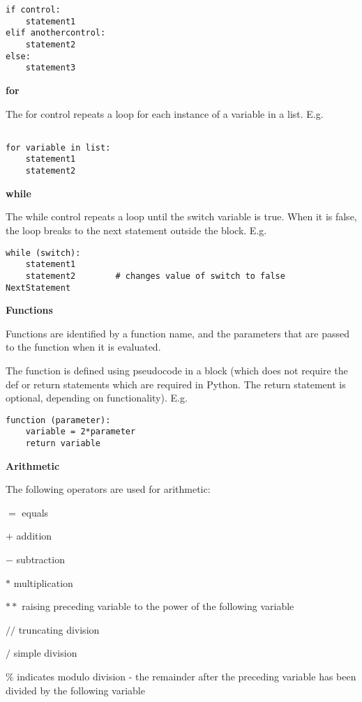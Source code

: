 \begin{verbatim}
if control:
    statement1
elif anothercontrol:
    statement2
else:
    statement3
\end{verbatim}

\textbf{for}

The for control repeats a loop for each instance of a variable in a list. E.g.

\begin{verbatim}

for variable in list:
    statement1
    statement2
\end{verbatim}

\textbf{while}

The while control repeats a loop until the switch variable is true. When
it is false, the loop breaks to the next statement outside the block.
E.g.

\begin{verbatim}
while (switch):
    statement1
    statement2        # changes value of switch to false
NextStatement
\end{verbatim}

\textbf{Functions}

Functions are identified by a function name, and the parameters that are
passed to the function when it is evaluated.

The function is defined using pseudocode in a block (which does not
require the def or return  statements which are required in Python. The
return  statement is optional, depending on functionality). E.g.

\begin{verbatim}
function (parameter):
    variable = 2*parameter
    return variable
\end{verbatim}

\textbf{Arithmetic}

The following operators are used for arithmetic:

$=$	equals

$+$	addition

$-$	subtraction

$*$	multiplication

$**$	raising preceding variable to the power of the following variable

$//$	truncating division

$/$	simple division

$\%$	indicates modulo division - the remainder after the preceding
variable has been divided by the following variable

